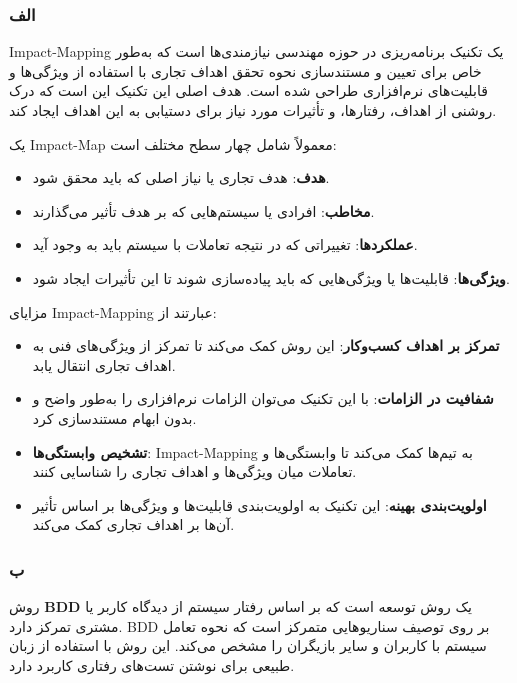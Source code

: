 \subsubsection*{الف}

Impact-Mapping یک تکنیک برنامه‌ریزی در حوزه مهندسی نیازمندی‌ها است که به‌طور خاص برای تعیین و مستندسازی نحوه تحقق اهداف تجاری با استفاده از ویژگی‌ها و قابلیت‌های نرم‌افزاری طراحی شده است. هدف اصلی این تکنیک این است که درک روشنی از اهداف، رفتارها، و تأثیرات مورد نیاز برای دستیابی به این اهداف ایجاد کند.

یک Impact-Map معمولاً شامل چهار سطح مختلف است:
\begin{itemize}
    \item \textbf{هدف}: هدف تجاری یا نیاز اصلی که باید محقق شود.
    \item \textbf{مخاطب}: افرادی یا سیستم‌هایی که بر هدف تأثیر می‌گذارند.
    \item \textbf{عملکردها}: تغییراتی که در نتیجه تعاملات با سیستم باید به وجود آید.
    \item \textbf{ویژگی‌ها}: قابلیت‌ها یا ویژگی‌هایی که باید پیاده‌سازی شوند تا این تأثیرات ایجاد شود.
\end{itemize}

مزایای Impact-Mapping عبارتند از:
\begin{itemize}
    \item \textbf{تمرکز بر اهداف کسب‌وکار}: این روش کمک می‌کند تا تمرکز از ویژگی‌های فنی به اهداف تجاری انتقال یابد.
    \item \textbf{شفافیت در الزامات}: با این تکنیک می‌توان الزامات نرم‌افزاری را به‌طور واضح و بدون ابهام مستندسازی کرد.
    \item \textbf{تشخیص وابستگی‌ها}: Impact-Mapping به تیم‌ها کمک می‌کند تا وابستگی‌ها و تعاملات میان ویژگی‌ها و اهداف تجاری را شناسایی کنند.
    \item \textbf{اولویت‌بندی بهینه}: این تکنیک به اولویت‌بندی قابلیت‌ها و ویژگی‌ها بر اساس تأثیر آن‌ها بر اهداف تجاری کمک می‌کند.
\end{itemize}


\subsubsection*{ب}

روش \textbf{BDD} یک روش توسعه است که بر اساس رفتار سیستم از دیدگاه کاربر یا مشتری تمرکز دارد. BDD بر روی توصیف سناریوهایی متمرکز است که نحوه تعامل سیستم با کاربران و سایر بازیگران را مشخص می‌کند. این روش با استفاده از زبان طبیعی برای نوشتن تست‌های رفتاری کاربرد دارد.

